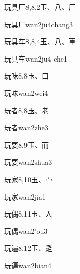 \begin{entry}{玩具厂}{8,8,2}{⽟、⼋、⼚}
  \begin{phonetics}{玩具厂}{wan2ju4chang3}
  \end{phonetics}
\end{entry}

\begin{entry}{玩具车}{8,8,4}{⽟、⼋、⾞}
  \begin{phonetics}{玩具车}{wan2ju4 che1}
  \end{phonetics}
\end{entry}

\begin{entry}{玩味}{8,8}{⽟、⼝}
  \begin{phonetics}{玩味}{wan2wei4}
  \end{phonetics}
\end{entry}

\begin{entry}{玩者}{8,8}{⽟、⽼}
  \begin{phonetics}{玩者}{wan2zhe3}
  \end{phonetics}
\end{entry}

\begin{entry}{玩耍}{8,9}{⽟、⽽}
  \begin{phonetics}{玩耍}{wan2shua3}
  \end{phonetics}
\end{entry}

\begin{entry}{玩家}{8,10}{⽟、⼧}
  \begin{phonetics}{玩家}{wan2jia1}
  \end{phonetics}
\end{entry}

\begin{entry}{玩偶}{8,11}{⽟、⼈}
  \begin{phonetics}{玩偶}{wan2'ou3}
  \end{phonetics}
\end{entry}

\begin{entry}{玩遍}{8,12}{⽟、⾡}
  \begin{phonetics}{玩遍}{wan2bian4}
  \end{phonetics}
\end{entry}

